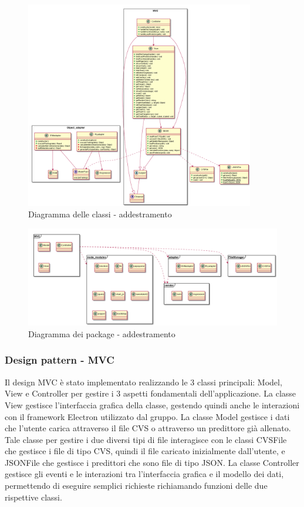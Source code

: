 \documentclass[../manuale-sviluppatore.tex]{subfiles}
\begin{document}
\begin{figure}[h]
   \begin{center}
        \includegraphics[width=10cm]{img/classDiagramTA.png}
        \caption{Diagramma delle classi - addestramento}
        \label{fig:diagramma_classi}
    \end{center}
\end{figure}

\begin{figure}[h!]
    \begin{center}
         \includegraphics[width=15cm]{img/packagesDiagramTA.png}
         \caption{Diagramma dei package - addestramento}
         \label{fig:daa}
     \end{center}
 \end{figure}

\subsubsection{Design pattern - MVC}
\label{ssec:design_pattern_mvc}
Il design MVC è stato implementato realizzando le 3 classi principali: Model, View e Controller per gestire i 3 aspetti fondamentali dell'applicazione.
La classe View gestisce l'interfaccia grafica della classe, gestendo quindi anche le interazioni con il framework Electron utilizzato dal gruppo.
La classe Model gestisce i dati che l'utente carica attraverso il file CVS o attraverso un predittore già allenato. Tale classe per gestire i due diversi tipi di file interagisce con le classi
CVSFile che gestisce i file di tipo CVS, quindi il file caricato inizialmente dall'utente, e JSONFile che gestisce i predittori che sono file di tipo JSON.
La classe Controller gestisce gli eventi e le interazioni tra l'interfaccia grafica e il modello dei dati, permettendo di eseguire semplici richieste richiamando funzioni delle due rispettive classi.
\end{document}
